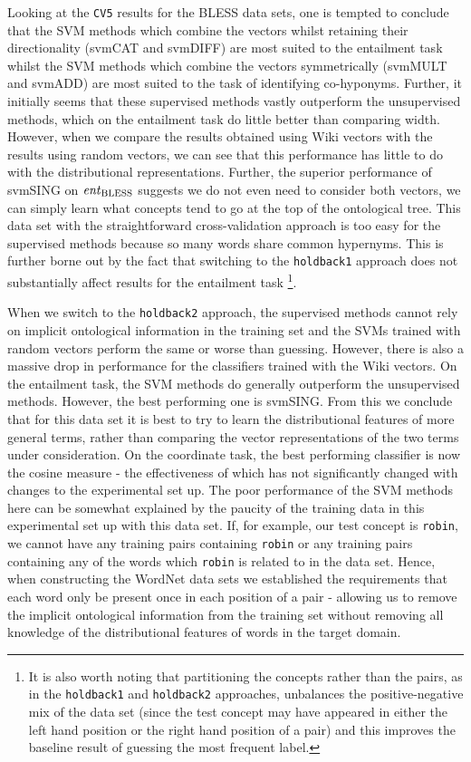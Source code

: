\documentclass[11pt]{article}
\newcommand\entBLESS{\mbox{\em ent\/}_{\mbox{\scriptsize BLESS}}}
\begin{document}
Looking at the \texttt{CV5} results for the BLESS data sets, one is tempted to conclude that the SVM methods which combine the vectors whilst retaining their directionality (svmCAT and svmDIFF) are most suited to the entailment task whilst the SVM methods which combine the vectors symmetrically (svmMULT and svmADD) are most suited to the task of identifying co-hyponyms.  Further, it initially seems that these supervised methods vastly outperform the unsupervised methods, which on the entailment task do little better than comparing width.  However, when we compare the results obtained using Wiki vectors with the results using random vectors, we can see that this performance has little to do with the distributional representations.  Further, the superior performance of svmSING on $\entBLESS$ suggests we do not even need to consider both vectors, we can simply learn what concepts tend to go at the top of the ontological tree.  This data set with the straightforward cross-validation approach is too easy for the supervised methods because so many words share common hypernyms.  This is further borne out by the fact that switching to the \texttt{holdback1} approach does not substantially affect results for the entailment task \footnote{It is also worth noting that partitioning the concepts rather than the pairs, as in the \texttt{holdback1} and \texttt{holdback2} approaches,  unbalances the positive-negative mix of the data set (since the test concept may have appeared in either the left hand position or the right hand position of a pair) and this improves the baseline result of guessing the most frequent label.}.

When we switch to the \texttt{holdback2} approach, the supervised methods cannot rely on implicit ontological information in the training set and the SVMs trained with random vectors perform the same or worse than guessing.  However, there is also a massive drop in performance for the classifiers trained with the Wiki vectors.   On the entailment task, the SVM methods do generally outperform the unsupervised methods.  However, the best performing one is svmSING.  From this we conclude that for this data set it is best to try to learn the distributional features of more general terms, rather than comparing the vector representations of the two terms under consideration.   On the coordinate task, the best performing classifier is now the cosine measure - the effectiveness of which has not significantly changed with changes to the experimental set up.   The poor performance of the SVM methods here can be somewhat explained by the paucity of the training data in this experimental set up with this data set.  If, for example, our test concept is \texttt{robin}, we cannot have any training pairs containing \texttt{robin} or any training pairs containing any of the words which \texttt{robin} is related to in the data set.  Hence, when constructing the WordNet data sets we established the requirements that each word only be present once in each position of a pair - allowing us to remove the implicit ontological information from the training set without removing all knowledge of the distributional features of words in the target domain.
\end{document}
